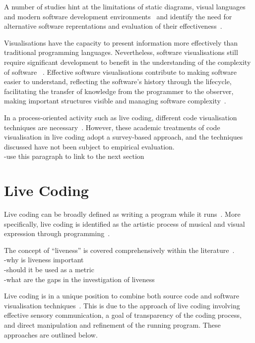 A number of studies hint at the limitations of static diagrams, visual languages and modern software development environments~ and identify the need for alternative software reprentations and evaluation of their effectiveness~. 

Visualisations have the capacity to present information more effectively than traditional programming languages. Nevertheless, software visualisations still require significant development to benefit in the understanding of the complexity of software ~\cite{Baecker1995}. Effective software visualisations contribute to making software easier to understand, reflecting the software's history through the lifecycle, facilitating the transfer of knowledge from the programmer to the observer, making important structures visible and managing software complexity~\cite{Baecker1995}.

In a process-oriented activity such as live coding, different code visualisation techniques are necessary~\cite{McLean2010a,Magnusson2013}. However, these academic treatments of code visualisation in live coding adopt a survey-based approach, and the techniques discussed have not been subject to empirical evaluation.\\
-use this paragraph to link to the next section

\section{Live Coding}

Live coding can be broadly defined as writing a program while it runs~\cite{Ward2004}. More specifically, live coding is identified as the artistic process of musical and visual expression through programming~\cite{Collins2003}.


The concept of ``liveness'' is covered comprehensively within the literature~\cite{Auslander,Masura2007}.\\
-why is liveness important\\
-should it be used as a metric\\
-what are the gaps in the investigation of liveness

Live coding is in a unique position to combine both source code and software visualisation techniques~\cite{McLean2010a}. This is due to the approach of live coding involving effective sensory communication, a goal of transparency of the coding process, and direct manipulation and refinement of the running program. These approaches are outlined below.

